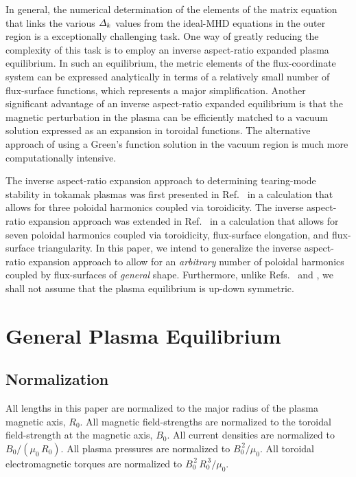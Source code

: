 \documentclass[12pt,prb,aps]{revtex4-1}
\begin{document}
In general, the  numerical determination of the elements of the matrix equation that links the various ${\mit\Delta}_k$ values from the ideal-MHD equations 
in the outer region is a exceptionally challenging task.\cite{nish,pletz,am2,aglas,aglas1}
One way of greatly reducing the complexity of this task is to employ an inverse aspect-ratio expanded plasma equilibrium.\cite{greene} In such an equilibrium,
the metric elements of the flux-coordinate system can be expressed analytically in terms of a relatively small number of  flux-surface functions,
which represents a major simplification.\cite{con0} Another significant advantage of an inverse aspect-ratio expanded equilibrium is that the magnetic perturbation in the plasma can be efficiently 
matched to a vacuum solution  expressed as an expansion in toroidal functions.\cite{am1} The alternative approach of using a Green's
function solution in the vacuum region is much more computationally intensive.\cite{chance,xu}

 The inverse aspect-ratio expansion approach to determining tearing-mode stability in tokamak plasmas 
was first presented in Ref.~ in a calculation that allows for three  poloidal harmonics coupled via toroidicity. 
The
inverse aspect-ratio expansion approach was extended in Ref.~ in a calculation that allows for seven poloidal harmonics coupled via toroidicity, flux-surface elongation, and
flux-surface triangularity. In this paper, we intend to generalize the inverse aspect-ratio expansion  approach to allow for an {\em arbitrary}\/ number of poloidal harmonics coupled
by flux-surfaces of {\em general}\/ shape. Furthermore, unlike Refs.~ and , we shall not assume that the plasma
equilibrium 
is up-down symmetric. 

\section{General Plasma Equilibrium}
\subsection{Normalization}\label{coords}
All lengths in this paper are normalized to  the major radius of the plasma magnetic axis, $R_0$. All magnetic field-strengths
are normalized to the  toroidal field-strength at the magnetic axis, $B_0$. All current densities are normalized to $B_0/(\mu_0\,R_0)$. All plasma pressures are normalized to $B_0^{\,2}/\mu_0$.
All toroidal electromagnetic torques are normalized to $B_0^{\,2}\,R_0^{\,3}/\mu_0$. 
\end{document}
